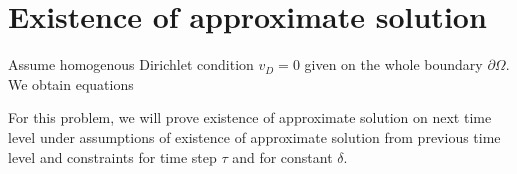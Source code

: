 \chapter{Existence of approximate solution}
 
Assume homogenous Dirichlet condition $v_D=0$ given on the whole boundary $\partial \Omega$. We obtain equations


For this problem, we will prove existence of approximate solution on next time level under assumptions of existence 
of approximate solution from previous time level and constraints for time step
$\tau$ and for constant $\delta$.

